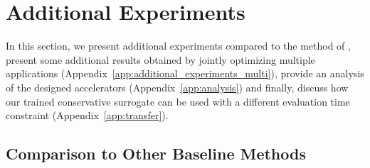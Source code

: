 \section{Additional Experiments}
In this section, we present additional experiments compared to the method of \citet{trabucco2021conservative}, present some additional results obtained by jointly optimizing multiple applications (Appendix~\ref{app:additional_experiments_multi}), provide an analysis of the designed accelerators (Appendix~\ref{app:analysis}) and finally, discuss how our trained conservative surrogate can be used with a different evaluation time constraint (Appendix~\ref{app:transfer}).

\subsection{Comparison to Other Baseline Methods}
\label{app:additional_experiments}


